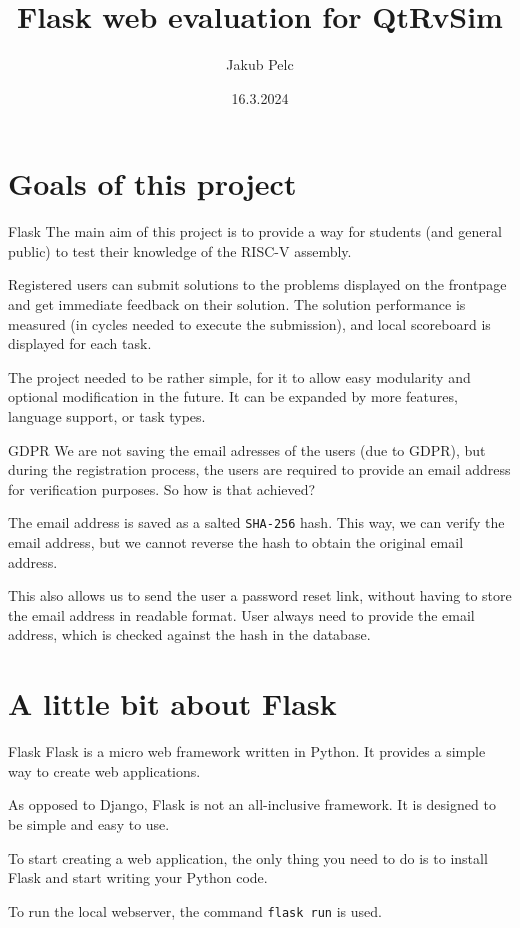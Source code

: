 \documentclass{beamer}
\title{Flask web evaluation for QtRvSim}
\date{16.3.2024}
\author{Jakub Pelc}
\institute{Faculty of Electrical Engineering, Czech Technical University in Prague}
\begin{document}
	\maketitle
	\section{Goals of this project}
	\begin{frame}{Flask}
		The main aim of this project is to provide a way for students (and general public) to test their knowledge of the RISC-V assembly.

		Registered users can submit solutions to the problems displayed on the frontpage and get immediate feedback on their solution.
		The solution performance is measured (in cycles needed to execute the submission), and local scoreboard is displayed for each task.\par

		The project needed to be rather simple, for it to allow easy modularity and optional modification in the future. It can be expanded by
		more features, language support, or task types.
	\end{frame}

	\begin{frame}{GDPR}
		We are not saving the email adresses of the users (due to GDPR), but during the registration process, the users are required to provide an email address for verification purposes. So how is that achieved?\par

		The email address is saved as a salted \texttt{SHA-256} hash. This way, we can verify the email address, but we cannot reverse the hash to obtain the original email address. \par

		This also allows us to send the user a password reset link, without having to store the email address in readable format. User always need to provide the email address, which is checked against the hash in the database.
	\end{frame}
	
	\section{A little bit about Flask}
	
	\begin{frame}{Flask}
		Flask is a micro web framework written in Python. It provides a simple way to create web applications. \par

		As opposed to Django, Flask is not an all-inclusive framework. It is designed to be simple and easy to use. \par

		To start creating a web application, the only thing you need to do is to install Flask and start writing your Python code.

		To run the local webserver, the command \texttt{flask run} is used.

	\end{frame}
\end{document}

